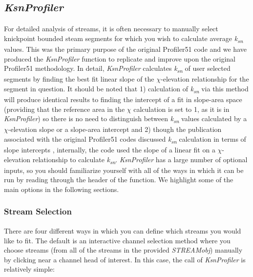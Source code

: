\subsection{\textit{KsnProfiler}} \label{sec:KsnProfiler}

\paragraph{}For detailed analysis of streams, it is often necessary to manually select knickpoint bounded steam segments for which you wish to calculate average \textit{k\textsubscript{sn}} values. This was the primary purpose of the original Profiler51 code and we have produced the \textit{KsnProfiler} function to replicate and improve upon the original Profiler51 methodology. In detail, \textit{KsnProfiler} calculates \textit{k\textsubscript{sn}} of user selected segments by finding the best fit linear slope of the $\chi$-elevation relationship for the segment in question. It should be noted that 1) calculation of \textit{k\textsubscript{sn}} via this method will produce identical results to finding the intercept of a fit in slope-area space (providing that the reference area in the $\chi$ calculation is set to 1, as it is in \textit{KsnProfiler}) so there is no need to distinguish between \textit{k\textsubscript{sn}} values calculated by a $\chi$-elevation slope or a slope-area intercept and 2) though the publication associated with the original Profiler51 codes discussed \textit{k\textsubscript{sn}} calculation in terms of slope intercepts \citep{Wobus2006}, internally, the code used the slope of a linear fit on a $\chi$-elevation relationship to calculate \textit{k\textsubscript{sn}}. \textit{KsnProfiler} has a large number of optional inputs, so you should familiarize yourself with all of the ways in which it can be run by reading through the header of the function. We highlight some of the main options in the following sections.

\subsubsection{Stream Selection}
\paragraph{}There are four different ways in which you can define which streams you would like to fit. The default is an interactive channel selection method where you choose streams (from all of the streams in the provided \textit{STREAMobj}) manually by clicking near a channel head of interest. In this case, the call of \textit{KsnProfiler} is relatively simple:

